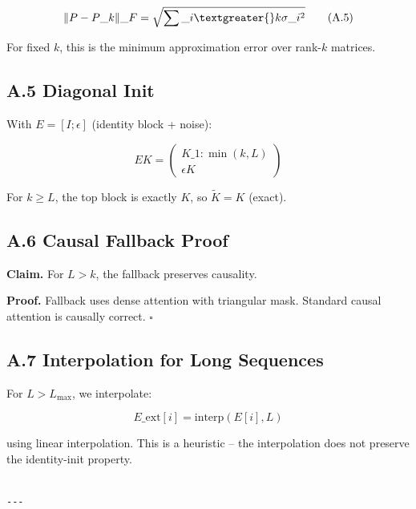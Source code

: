 \[
\|P - P\_k\|\_F = \sqrt{\sum\_{i \textgreater{} k} \sigma\_i^2}
\tag{A.5}
\]

For fixed $k$, this is the minimum approximation error over rank-$k$ matrices.

\subsection{A.5 Diagonal Init}

With $E = [I; \epsilon]$ (identity block + noise):

\[
E K = \begin{pmatrix} K\_{1:\min(k,L)} \\ \epsilon K \end{pmatrix}
\tag{A.6}
\]

For $k \geq L$, the top block is exactly $K$, so $\tilde{K} = K$ (exact).

\subsection{A.6 Causal Fallback Proof}

\textbf{Claim.} For $L > k$, the fallback preserves causality.

\textbf{Proof.} Fallback uses dense attention with triangular mask. Standard 
causal attention is causally correct. $\square$

\subsection{A.7 Interpolation for Long Sequences}

For $L > L_\text{max}$, we interpolate:

\[
E\_\text{ext}[i] = \text{interp}(E[i], L)
\tag{A.7}
\]

using linear interpolation. This is a heuristic -- the interpolation does 
not preserve the identity-init property.
\begin{lstlisting}

---
\end{lstlisting}